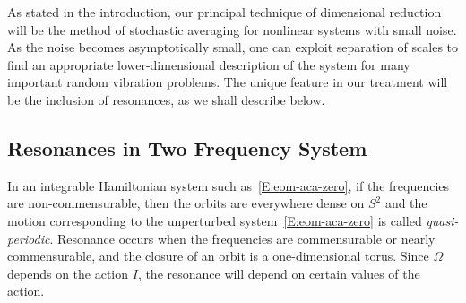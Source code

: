 As stated in the introduction, our principal technique of dimensional reduction will be the method of stochastic averaging for nonlinear systems with small noise. As the noise becomes asymptotically small, one can exploit separation of scales to find an appropriate lower-dimensional description of the system for many important random vibration problems. The unique feature in our treatment will be the inclusion of resonances, as we shall describe below.

\subsection{Resonances in Two Frequency System}

In an integrable Hamiltonian system such as~\eqref{E:eom-aca-zero}, if the frequencies are non-commensurable, then the orbits are everywhere dense on $S^2$ and the motion corresponding to the unperturbed system~\eqref{E:eom-aca-zero} is called \emph{quasi-periodic}. Resonance occurs when the frequencies are commensurable or nearly commensurable, and the closure of an orbit is a one-dimensional torus. Since $\Omega$ depends on the action $I$, the resonance will depend on certain values of the action.

